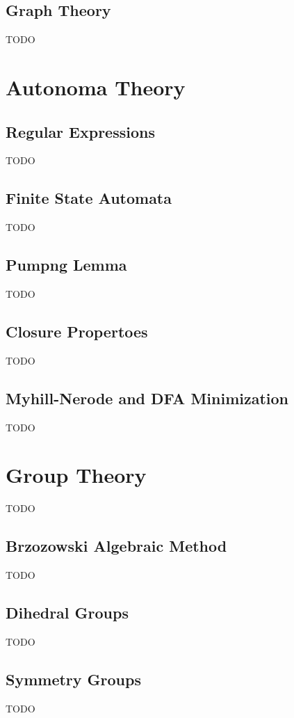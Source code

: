 \documentclass{article}
\theoremstyle{definition}
\begin{document}
\subsection{Graph Theory}
TODO


\section{Autonoma Theory}

\subsection{Regular Expressions}
TODO
 
 \subsection{Finite State Automata}
TODO

\subsection{Pumpng Lemma}
TODO

\subsection{Closure Propertoes}
TODO

\subsection{Myhill-Nerode and DFA Minimization}
TODO

\section{Group Theory}
TODO

\subsection{Brzozowski Algebraic Method}
TODO

\subsection{Dihedral Groups}
TODO

\subsection{Symmetry Groups}
TODO
\end{document}
